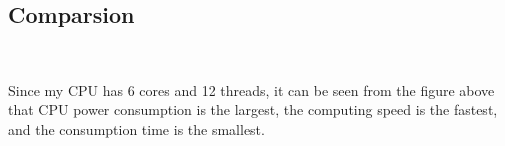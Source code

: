 \documentclass{article}
\begin{document}
\subsection{Comparsion}
\begin{figure}[H]
    \\
\end{figure}

Since my CPU has 6 cores and 12 threads, it can be seen from the figure above that CPU power consumption is the largest, the computing speed is the fastest, and the consumption time is the smallest.
\end{document}
